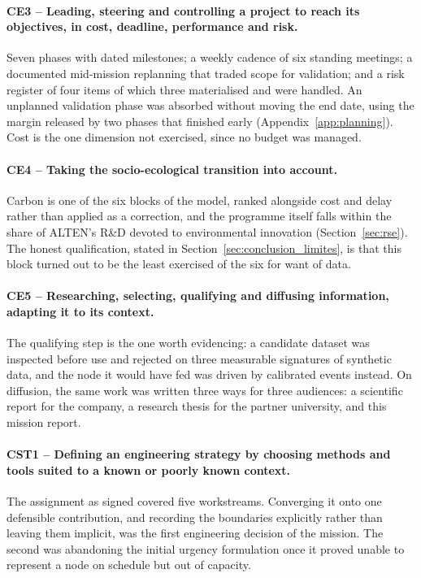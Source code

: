 \paragraph{CE3 -- Leading, steering and controlling a project to reach its objectives, in
cost, deadline, performance and risk.}
Seven phases with dated milestones; a weekly cadence of six standing meetings; a documented
mid-mission replanning that traded scope for validation; and a risk register of four items of
which three materialised and were handled. An unplanned validation phase was absorbed
without moving the end date, using the margin released by two phases that finished early
(Appendix~\ref{app:planning}). Cost is the one dimension not exercised, since no budget was
managed.

\paragraph{CE4 -- Taking the socio-ecological transition into account.}
Carbon is one of the six blocks of the model, ranked alongside cost and delay rather than
applied as a correction, and the programme itself falls within the share of ALTEN's R\&D
devoted to environmental innovation (Section~\ref{sec:rse}). The honest qualification, stated
in Section~\ref{sec:conclusion_limites}, is that this block turned out to be the least
exercised of the six for want of data.

\paragraph{CE5 -- Researching, selecting, qualifying and diffusing information, adapting it
to its context.}
The qualifying step is the one worth evidencing: a candidate dataset was inspected before use
and rejected on three measurable signatures of synthetic data, and the node it would have fed
was driven by calibrated events instead. On diffusion, the same work was written three ways
for three audiences: a scientific report for the company, a research thesis for the partner
university, and this mission report.

\paragraph{CST1 -- Defining an engineering strategy by choosing methods and tools suited to a
known or poorly known context.}
The assignment as signed covered five workstreams. Converging it onto one defensible
contribution, and recording the boundaries explicitly rather than leaving them implicit, was
the first engineering decision of the mission. The second was abandoning the initial urgency
formulation once it proved unable to represent a node on schedule but out of capacity.

